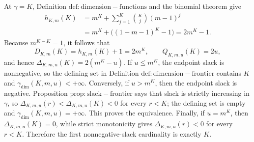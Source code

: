 At \(\gamma=K\), Definition \(\mathrm{def:dimension-functions}\) and the binomial theorem give
\[\begin{aligned}h_{K,m}(K)&=m^K+\sum_{j=1}^{K}\binom Kj(m-1)^j\\&=m^K+\bigl((1+m-1)^K-1\bigr)=2m^K-1.\end{aligned}\]
Because \(m^{K-K}=1\), it follows that
\[D_{K,m}(K)=h_{K,m}(K)+1=2m^K,\qquad Q_{K,m,u}(K)=2u,\]
and hence \(\Delta_{K,m,u}(K)=2(m^K-u)\). If \(u\le m^K\), the endpoint slack is nonnegative, so the defining set in Definition \(\mathrm{def:dimension-frontier}\) contains \(K\) and \(\gamma_{\mathrm{dim}}(K,m,u)<+\infty\). Conversely, if \(u>m^K\), then the endpoint slack is negative. Proposition \(\mathrm{prop:slack-frontier}\) says that slack is strictly increasing in \(\gamma\), so \(\Delta_{K,m,u}(r)<\Delta_{K,m,u}(K)<0\) for every \(r<K\); the defining set is empty and \(\gamma_{\mathrm{dim}}(K,m,u)=+\infty\). This proves the equivalence. Finally, if \(u=m^K\), then \(\Delta_{K,m,u}(K)=0\), while strict monotonicity gives \(\Delta_{K,m,u}(r)<0\) for every \(r<K\). Therefore the first nonnegative-slack cardinality is exactly \(K\).
